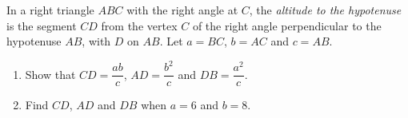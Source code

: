 In a right triangle $ABC$ with the right angle at $C$, the \emph{altitude to the hypotenuse} is the segment $CD$ from the vertex $C$ of the right angle perpendicular to the hypotenuse $AB$, with $D$ on $AB$. Let $a=BC$, $b=AC$ and $c=AB$.
\begin{enumerate}
\item[(a)] Show that $CD=\dfrac{ab}{c}$, $AD=\dfrac{b^2}{c}$ and $DB=\dfrac{a^2}{c}$.
\item[(b)] Find $CD$, $AD$ and $DB$ when $a=6$ and $b=8$.
\end{enumerate}
